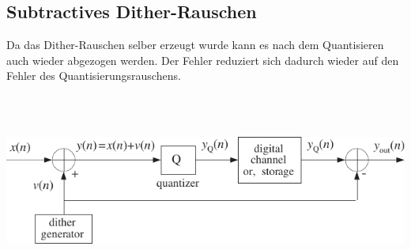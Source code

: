 	\subsection{Subtractives Dither-Rauschen}
		\begin{minipage}{1\textwidth}
			Da das Dither-Rauschen selber erzeugt wurde kann es nach dem Quantisieren auch wieder abgezogen werden. Der Fehler reduziert sich dadurch wieder auf den Fehler des Quantisierungsrauschens.\\[0.2cm]
			$\qquad$
		\end{minipage}\\[0.5cm]
		\begin{minipage}{0.7\textwidth}
			\includegraphics[width = \textwidth]{pic/ditherSub.pdf}\\[0.2cm]
		\end{minipage}



